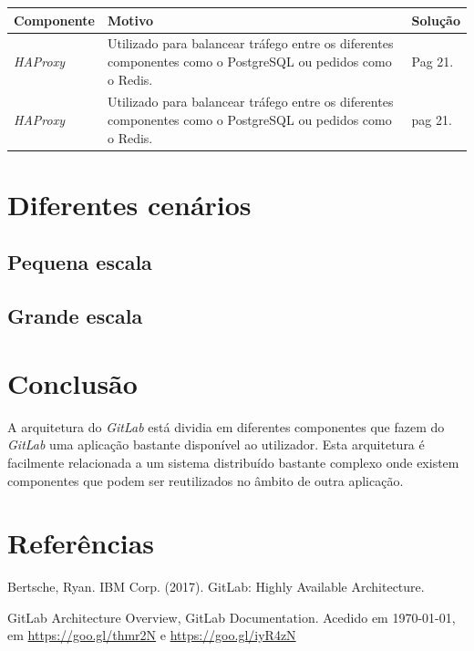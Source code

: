 \documentclass[12pt,a4paper]{article}
\begin{document}
\begin{center}
    \small
    \begin{tabular}{ | l | p{6cm} | p{6cm} |}
    \hline
    \textbf{Componente} & \textbf{Motivo} & \textbf{Solução} \\ \hline
    \textit{HAProxy} & Utilizado para balancear tráfego entre os diferentes componentes como o PostgreSQL ou pedidos como o Redis. & Pag 21. \\ \hline
    \textit{HAProxy} & Utilizado para balancear tráfego entre os diferentes componentes como o PostgreSQL ou pedidos como o Redis. & pag 21. \\
    \hline
    \end{tabular}
\end{center}

\section{Diferentes cenários}
\subsection{Pequena escala}
\subsection{Grande escala}




\newpage
\section{Conclusão}

A arquitetura do \emph{GitLab} está dividia em diferentes componentes que fazem do \emph{GitLab} uma aplicação bastante disponível ao utilizador. Esta arquitetura é facilmente relacionada a um sistema distribuído bastante complexo onde existem componentes que podem ser reutilizados no âmbito de outra aplicação.

\newpage
\section{Referências}

\vspace{1.3cm}
Bertsche, Ryan. IBM Corp. (2017). GitLab: Highly Available Architecture.

\bigbreak
GitLab Architecture Overview, GitLab Documentation. Acedido em \today, em \url{https://goo.gl/thmr2N} e \url{https://goo.gl/iyR4zN} 
\end{document}
